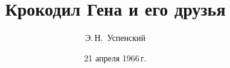 

\newcommand{\docTitle}{Крокодил Гена и его друзья}


\title{\docTitle}

\author{Э.\,Н.~Успенский\\
}

\date{21 апреля 1966\,г.}

